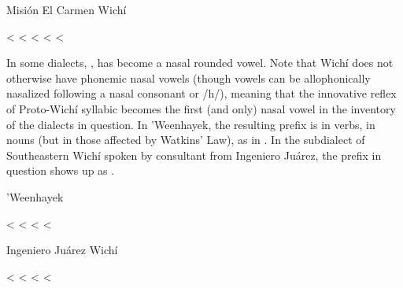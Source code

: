\ea
Misión El Carmen Wichí \citep[131–132, 138]{MC09}\\
    \begin{xlist}
        \ex {} <  \label{sn-mec-steal}
        \ex {} < 
        \ex {} < 
        \ex {} <  \label{sn-mec-work}
        \ex {} <  \label{sn-mec-thirsty}
    \end{xlist}
\z
{}

In some dialects, ,  has become a nasal rounded vowel. Note that Wichí does not otherwise have phonemic nasal vowels (though vowels can be allophonically nasalized following a nasal consonant or /h/), meaning that the innovative reflex of Proto-Wichí syllabic  becomes the first (and only) nasal vowel in the inventory of the dialects in question. In ’Weenhayek, the resulting prefix is  in verbs,  in nouns (but  in those affected by Watkins’ Law), as in . In the subdialect of Southeastern Wichí spoken by  consultant from Ingeniero Juárez, the prefix in question shows up as  .

\ea
’Weenhayek \citep[13]{KC94} \label{sn-whk}\\
    \begin{xlist}
        \ex {} < 
        \ex {} < 
        \ex {} < 
        \ex {} < 
    \end{xlist}
\z
\ea
Ingeniero Juárez Wichí \citep[98, 100–101]{LCB-MBC09} \label{sn-ij}\\
    \begin{xlist}
        \ex {} < 
        \ex {} < 
        \ex {} < 
        \ex {} < 
    \end{xlist}
\z
{}

